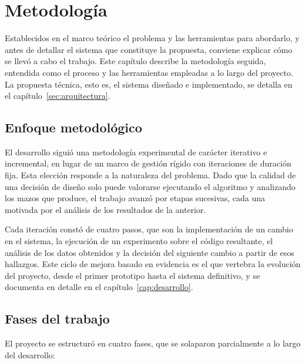 
\chapter{Metodología}
\label{cap:metodologia}

Establecidos en el marco teórico el problema y las herramientas para abordarlo, y antes de detallar el sistema que constituye la propuesta, conviene explicar cómo se llevó a cabo el trabajo. Este capítulo describe la metodología seguida, entendida como el proceso y las herramientas empleadas a lo largo del proyecto. La propuesta técnica, esto es, el sistema diseñado e implementado, se detalla en el capítulo~\ref{sec:arquitectura}.

\section{Enfoque metodológico}

El desarrollo siguió una metodología experimental de carácter iterativo e incremental, en lugar de un marco de gestión rígido con iteraciones de duración fija. Esta elección responde a la naturaleza del problema. Dado que la calidad de una decisión de diseño solo puede valorarse ejecutando el algoritmo y analizando los mazos que produce, el trabajo avanzó por etapas sucesivas, cada una motivada por el análisis de los resultados de la anterior.

Cada iteración constó de cuatro pasos, que son la implementación de un cambio en el sistema, la ejecución de un experimento sobre el código resultante, el análisis de los datos obtenidos y la decisión del siguiente cambio a partir de esos hallazgos. Este ciclo de mejora basado en evidencia es el que vertebra la evolución del proyecto, desde el primer prototipo hasta el sistema definitivo, y se documenta en detalle en el capítulo~\ref{cap:desarrollo}.

\section{Fases del trabajo}

El proyecto se estructuró en cuatro fases, que se solaparon parcialmente a lo largo del desarrollo:

